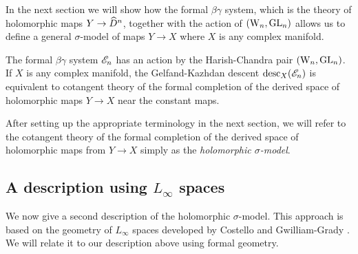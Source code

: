 \documentclass[10pt]{amsart}
\begin{document}

In the next section we will show how the formal $\beta\gamma$ system, which is the theory of holomorphic maps $Y \to \widehat{D}^n$, together with the action of $({{\rm W}_n}, {\rm GL}_n)$ allows us to define a general $\sigma$-model of maps $Y \to X$ where $X$ is any complex manifold.

\begin{prop}\label{prop: formal to global1}
The formal $\beta\gamma$ system $\mathscr E_n$ has an action by the Harish-Chandra pair $({{\rm W}_n}, {\rm GL}_n)$. 
If $X$ is any complex manifold, the Gelfand-Kazhdan descent ${\rm desc}_X(\mathscr E_n)$ is equivalent to cotangent theory of the formal completion of the derived space of holomorphic maps $Y \to X$ near the constant maps.
\end{prop}

\begin{rmk}
After setting up the appropriate terminology in the next section, we will refer to the cotangent theory of the formal completion of the derived space of holomorphic maps from $Y \to X$ simply as the {\em holomorphic $\sigma$-model}.
\end{rmk}

\subsection{A description using $L_\infty$ spaces}

We now give a second description of the holomorphic $\sigma$-model.
This approach is based on the geometry of $L_\infty$ spaces developed by Costello \cite{WG2} and Gwilliam-Grady \cite{GWCS, GWderived}.
We will relate it to our description above using formal geometry.
\end{document}
